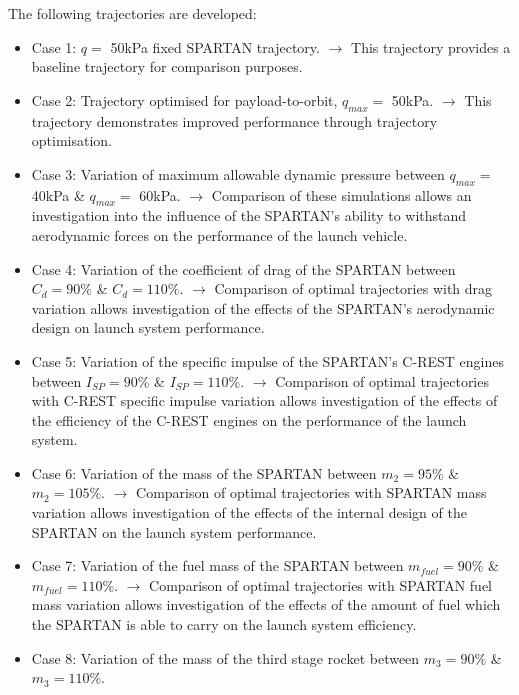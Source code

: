The following trajectories are developed: 
\begin{itemize}
	\item Case 1: $q = $ 50kPa fixed SPARTAN trajectory. \newline$\rightarrow$ This trajectory provides a baseline trajectory for comparison purposes.
	\item Case 2: Trajectory optimised for payload-to-orbit, $q_{max} = $ 50kPa. \newline$\rightarrow$ This trajectory demonstrates improved performance through trajectory optimisation.
	\item Case 3: Variation of maximum allowable dynamic pressure between $q_{max} = $ 40kPa \& $q_{max} = $ 60kPa. 
	\newline$\rightarrow$ Comparison of these simulations allows an investigation into the influence of the SPARTAN's ability to withstand aerodynamic forces on the performance of the launch vehicle.
	\item Case 4: Variation of the coefficient of drag of the SPARTAN between $C_d = 90\%$ \& $C_d = 110\%$. 
	\newline$\rightarrow$ Comparison of optimal trajectories with drag variation allows investigation of the effects of the SPARTAN's aerodynamic design on launch system performance.
	\item Case 5: Variation of the specific impulse of the SPARTAN's C-REST engines between $I_{SP} = 90\%$ \& $I_{SP} = 110\%$. 
	\newline$\rightarrow$ Comparison of optimal trajectories with C-REST specific impulse variation allows investigation of the effects of the efficiency of the C-REST engines on the performance of the launch system. 
	\item Case 6: Variation of the mass of the SPARTAN between $m_2 = 95\%$ \& $m_2 = 105\%$. 
	\newline$\rightarrow$ Comparison of optimal trajectories with SPARTAN mass variation allows investigation of the effects of the internal design of the SPARTAN on the launch system performance. 
	\item Case 7: Variation of the fuel mass of the SPARTAN between $m_{fuel} = 90\%$ \& $m_{fuel} = 110\%$. 
	\newline$\rightarrow$ Comparison of optimal trajectories with SPARTAN fuel mass variation allows investigation of the effects of the amount of fuel which the SPARTAN is able to carry on the launch system efficiency. 
	\item Case 8: Variation of the mass of the third stage rocket between $m_3 = 90\%$ \& $m_3 = 110\%$. 

\end{itemize}
